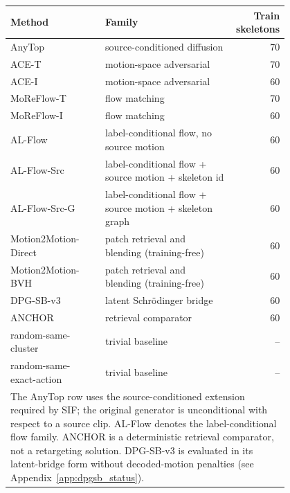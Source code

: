 \begin{tabular}{p{0.34\linewidth}p{0.46\linewidth}r}
\toprule
Method & Family & Train skeletons \\
\midrule
AnyTop & source-conditioned diffusion & 70 \\
ACE-T & motion-space adversarial & 70 \\
ACE-I & motion-space adversarial & 60 \\
MoReFlow-T & flow matching & 70 \\
MoReFlow-I & flow matching & 60 \\
AL-Flow & label-conditional flow, no source motion & 60 \\
AL-Flow-Src & label-conditional flow + source motion + skeleton id & 60 \\
AL-Flow-Src-G & label-conditional flow + source motion + skeleton graph & 60 \\
Motion2Motion-Direct & patch retrieval and blending (training-free) & 60 \\
Motion2Motion-BVH & patch retrieval and blending (training-free) & 60 \\
DPG-SB-v3 & latent Schr\"odinger bridge & 60 \\
ANCHOR & retrieval comparator & 60 \\
random-same-cluster & trivial baseline & -- \\
random-same-exact-action & trivial baseline & -- \\
\midrule
\multicolumn{3}{p{0.94\linewidth}}{\footnotesize The AnyTop row uses the source-conditioned extension required by SIF; the original generator is unconditional with respect to a source clip. AL-Flow denotes the label-conditional flow family. ANCHOR is a deterministic retrieval comparator, not a retargeting solution. DPG-SB-v3 is evaluated in its latent-bridge form without decoded-motion penalties (see Appendix~\ref{app:dpgsb_status}).} \\
\bottomrule
\end{tabular}
